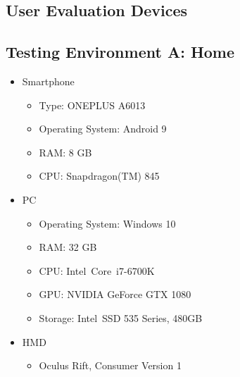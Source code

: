 
\begin{appendices}
  \chapter{User Evaluation Devices}\label{chapter:append-user-eval-devices}
  \section{Testing Environment A: Home}
  \begin{itemize}
    \item Smartphone
    \begin{itemize}
      \item Type: ONEPLUS A6013
      \item Operating System: Android 9
      \item RAM: 8 GB
      \item CPU: Snapdragon(TM) 845 %
    \end{itemize}
    \item \ac{PC}
    \begin{itemize}
      \item Operating System: Windows 10
      \item RAM: 32 GB
      \item CPU: Intel\textregistered\ Core\texttrademark\ i7-6700K %
      \item GPU: NVIDIA GeForce GTX 1080
      \item Storage: Intel\textregistered\ SSD 535 Series, 480GB
    \end{itemize}
    \item \ac{HMD}
    \begin{itemize}
      \item Oculus Rift, Consumer Version 1
    \end{itemize}
  \end{itemize}

  \filbreak{}

\end{appendices}
